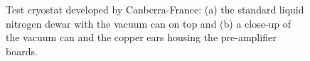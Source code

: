 \begin{figure}[tbhp] 
  \centering 
  \hfil%
  \caption{Test cryostat developed by Canberra-France: (a) the     standard liquid nitrogen dewar with the vacuum can on top and (b)     a close-up of the vacuum can and the copper ears housing the     pre-amplifier boards.}
  \label{fig:tt:comcryo}
\end{figure}


